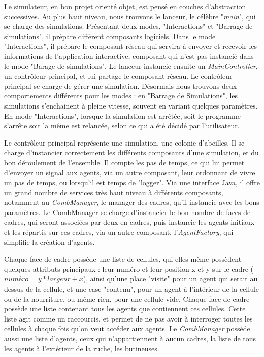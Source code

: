 			Le simulateur, en bon projet orienté objet, est pensé en couches d'abstraction successives. Au plus haut niveau, nous trouvons le lanceur, le célèbre "\textit{main}", qui se charge des simulations. Présentant deux modes, "Interactions" et "Barrage de simulations", il prépare différent composants logiciels. Dans le mode "Interactions", il prépare le composant réseau qui servira à envoyer et recevoir les informations de l'application interactive, composant qui n'est pas instancié dans le mode "Barage de simulations". Le lanceur instancie ensuite un \textit{MainController}, un contrôleur principal, et lui partage le composant réseau. Le contrôleur principal se charge de gérer une simulation. Désormais nous trouvons deux comportements différents pour les modes : en "Barrage de Simulations", les simulations s'enchainent à pleine vitesse, souvent en variant quelques paramètres. En mode "Interactions", lorsque la simulation est arrêtée, soit le programme s'arrête soit la même est relancée, selon ce qui a été décidé par l'utilisateur.
			
			Le contrôleur principal représente une simulation, une colonie d'abeilles. Il se charge d'instancier correctement les différents composants d'une simulation, et du bon déroulement de l'ensemble. Il compte les pas de temps, ce qui lui permet d'envoyer un signal aux agents, via un autre composant, leur ordonnant de vivre un pas de temps, ou lorsqu'il est temps de "logger". Via une interface Java, il offre un grand nombre de services très haut niveau à différents composants, notamment au \textit{CombManager}, le manager des cadres, qu'il instancie avec les bons paramètres. Le CombManager se charge d'instancier le bon nombre de faces de cadres, qui seront associées par deux en cadres, puis instancie les agents initiaux et les répartis sur ces cadres, via un autre composant, l'\textit{AgentFactory}, qui simplifie la création d'agents.
			
			Chaque face de cadre possède une liste de cellules, qui elles même possèdent quelques attributs principaux : leur numéro et leur position x et y sur le cadre ($numéro = y * largeur + x$), ainsi qu'une place "visite" pour un agent qui serait au dessus de la cellule, et une case "contenu", pour un agent à l'intérieur de la cellule ou de la nourriture, ou même rien, pour une cellule vide. Chaque face de cadre possède une liste contenant tous les agents que contiennent ces cellules. Cette liste agit comme un raccourcis, et permet de ne pas avoir à interroger toutes les cellules à chaque fois qu'on veut accéder aux agents. Le \textit{CombManager} possède aussi une liste d'agents, ceux qui n'appartiennent à aucun cadres, la liste de tous les agents à l'extérieur de la ruche, les butineuses.
			
